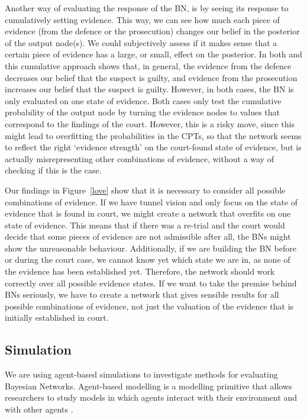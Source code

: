 \documentclass[12pt]{article}
\begin{document}
\begin{enumerate}
Another way of evaluating the response of the BN, is by seeing its response to cumulatively setting evidence. This way, we can see how much each piece of evidence (from the defence or the prosecution) changes our belief in the posterior of the output node(s). We could subjectively assess if it makes sense that a certain piece of evidence has a large, or small, effect on the posterior. In both \citep{Fenton2019} and \citep{vlek2016} this cumulative approach shows that, in general, the evidence from the defence decreases our belief that the suspect is guilty, and evidence from the prosecution increases our belief that the suspect is guilty. However, in both cases, the BN is only evaluated on one state of evidence. Both cases only test the cumulative probability of the output node by turning the evidence nodes to values that correspond to the findings of the court. However, this is a risky move, since this might lead to overfitting the probabilities in the CPTs, so that the network seems to reflect the right `evidence strength' on the court-found state of evidence, but is actually misrepresenting other combinations of evidence, without a way of checking if this is the case.




\end{enumerate}


Our findings in Figure~\ref{love} show that it is necessary to consider all possible combinations of evidence. If we have tunnel vision and only focus on the state of evidence that is found in court, we might create a network that overfits on one state of evidence. This means that if there was a re-trial and the court would decide that some pieces of evidence are not admissible after all, the BNs might show the unreasonable behaviour. Additionally, if we are building the BN before or during the court case, we cannot know yet which state we are in, as none of the evidence has been established yet. Therefore, the network should work correctly over all possible evidence states. If we want to take the premise behind BNs seriously, we have to create a network that gives sensible results for all possible combinations of evidence, not just the valuation of the evidence that is initially established in court.

\subsection{Simulation}

We are using agent-based simulations to investigate methods for evaluating Bayesian Networks. Agent-based modelling is a modelling primitive that allows researchers to study models in which agents interact with their environment and with other agents \citep{gilbert2000}. 
\end{document}
